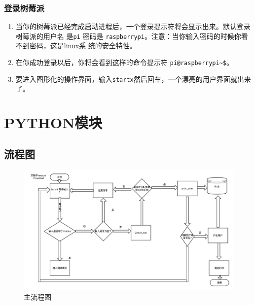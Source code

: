 \subsubsection{登录树莓派}

\begin{enumerate}
\item 当你的树莓派已经完成启动进程后，一个登录提示符将会显示出来。默认登录树莓派的用户名
  是\verb|pi| 密码是 \verb|raspberrypi|。注意：当你输入密码的时候你看不到密码，这是linux系
  统的安全特性。
\item 在你成功登录以后，你将会看到这样的命令提示符 \verb|pi@raspberrypi~$|。
\item 要进入图形化的操作界面，输入\verb|startx|然后回车，一个漂亮的用户界面就出来了。
\end{enumerate}

\section{PYTHON模块}

\subsection{流程图}
\label{sec:desc}

\begin{figure}%
  \centering
  \includegraphics[width=.7\textwidth]{pic/flowchart}
  \caption{主流程图}
  \label{fig:struct}
\end{figure}

